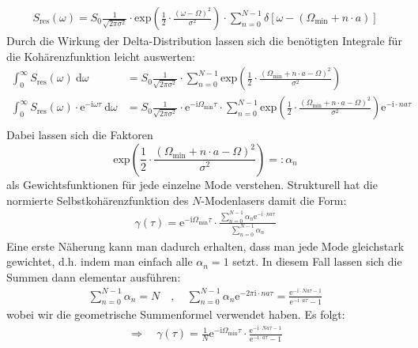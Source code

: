 \documentclass[german,  %
parskip=full,  %
]{scrartcl}
\begin{document}
\begin{align}
S_{\mathrm{res}}(\omega) =  S_0 \frac{1}{\sqrt{2\pi\sigma^2}}\cdot\mathrm{exp}\left(\frac{1}{2}\cdot\frac{(\omega-\Omega)^2}{\sigma^2}\right) \cdot\sum_{n = 0}^{N-1} \delta\left[\omega - \left(\Omega_{\mathrm{min}} + n\cdot a\right)\right]
\end{align}
Durch die Wirkung der Delta-Distribution lassen sich die benötigten Integrale für die Kohärenzfunktion leicht auswerten:
\begin{align*}
\int_{0}^{\infty} S_{\mathrm{res}}(\omega) \ \mathrm{d}\omega &= S_0 \frac{1}{\sqrt{2\pi\sigma^2}}\cdot\sum_{n = 0}^{N-1}\mathrm{exp}\left(\frac{1}{2}\cdot\frac{(\Omega_{\mathrm{min}} + n\cdot  a -\Omega)^2}{\sigma^2}\right)   \\
\int_{0}^{\infty} S_{\mathrm{res}}(\omega)\cdot\mathrm{e}^{-\mathrm{i}\omega\tau} \ \mathrm{d}\omega &=  S_0 \frac{1}{\sqrt{2\pi\sigma^2}} \cdot\mathrm{e}^{-\mathrm{i}\Omega_{\mathrm{min}}\tau}\cdot\sum_{n = 0}^{N-1}\mathrm{exp}\left(\frac{1}{2}\cdot\frac{(\Omega_{\mathrm{min}} + n\cdot  a -\Omega)^2}{\sigma^2}\right) \mathrm{e}^{-\mathrm{i}\cdot na\tau} \\
\end{align*}
Dabei lassen sich die Faktoren 
\[\mathrm{exp}\left(\frac{1}{2}\cdot\frac{(\Omega_{\mathrm{min}} + n\cdot  a -\Omega)^2}{\sigma^2}\right) =: \alpha_n\]
als Gewichtsfunktionen für jede einzelne Mode verstehen. Strukturell hat die normierte Selbstkohärenzfunktion des \(N\)-Modenlasers damit die Form:
\begin{align}
\gamma(\tau) = \mathrm{e}^{-\mathrm{i}\Omega_{\mathrm{min}}\tau} \cdot \frac{\sum_{n=0}^{N-1}\alpha_n\mathrm{e}^{-\mathrm{i}\cdot na\tau}}{\sum_{n=0}^{N-1}\alpha_n}
\end{align}
Eine erste Näherung kann man dadurch erhalten, dass man jede Mode gleichstark gewichtet, d.h. indem man einfach alle \(\alpha_n = 1\) setzt. In diesem Fall lassen sich die Summen dann elementar ausführen:
\begin{align*}
\sum_{n=0}^{N-1}\alpha_n = N \quad , \quad
\sum_{n=0}^{N-1}\alpha_n\mathrm{e}^{-2\pi\mathrm{i}\cdot na\tau} = \frac{\mathrm{e}^{-\mathrm{i}\cdot Na\tau - 1}}{\mathrm{e}^{-\mathrm{i}\cdot a\tau} - 1} 
\end{align*}
wobei wir die geometrische Summenformel verwendet haben. Es folgt:
\begin{align}
\Longrightarrow\quad \gamma(\tau) = \frac{1}{N} \mathrm{e}^{-\mathrm{i}\Omega_{\mathrm{min}}\tau}\cdot\frac{\mathrm{e}^{-\mathrm{i}\cdot Na\tau - 1}}{\mathrm{e}^{-\mathrm{i}\cdot a\tau} - 1}
\end{align}
\end{document}
